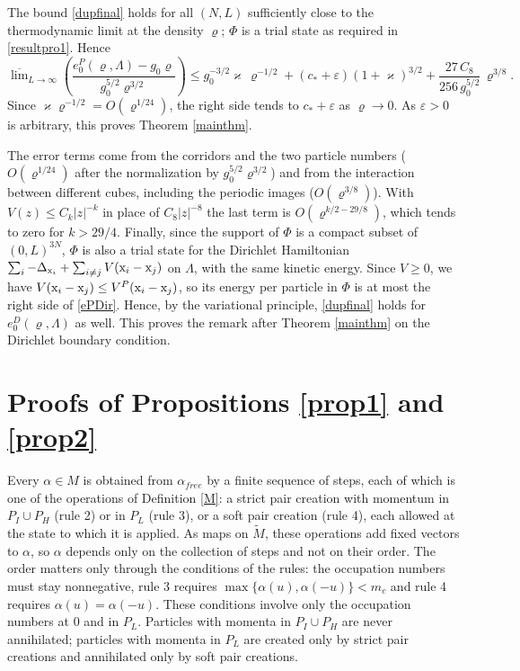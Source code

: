 \documentclass[11pt]{article}
\numberwithin{equation}{section}
\newcommand{\e}{\varepsilon}
\newcommand{\x}{{\rm x}}
\newcommand\al{{\alpha}}
\renewcommand\kappa\varkappa
\renewcommand\rho\varrho
\theoremstyle{definition}
\begin{document}
\smallskip{}
The bound \eqref{dupfinal} holds for all $(N,L)$ sufficiently close to the thermodynamic limit at the density $\rho$; $\Phi$ is a trial state as required in \eqref{resultpro1}. Hence
\[
\overline\lim_{L\to\infty}\left(\frac{e_0^P(\rho,\Lambda)-g_0\rho}{g_0^{5/2}\rho^{3/2}}\right)\leq g_0^{-3/2}\kappa\,\rho^{-1/2}+(c_*+\e)(1+\kappa)^{3/2}+\frac{27\,C_8}{256\,g_0^{5/2}}\,\rho^{3/8} .
\]
Since $\kappa\rho^{-1/2}=O(\rho^{1/24})$, the right side tends to $c_*+\e$ as $\rho\to0$. As $\e>0$ is arbitrary, this proves Theorem \ref{mainthm}.

The error terms come from the corridors and the two particle numbers ($O(\rho^{1/24})$ after the normalization by $g_0^{5/2}\rho^{3/2}$) and from the interaction between different cubes, including the periodic images ($O(\rho^{3/8})$).
With $V(z)\leq C_k|z|^{-k}$ in place of $C_8|z|^{-8}$ the last term is $O(\rho^{k/2-29/8})$, which tends to zero for $k>29/4$.
Finally, since the support of $\Phi$ is a compact subset of $(0,L)^{3N}$, $\Phi$ is also a trial state for the Dirichlet Hamiltonian $\sum_i-\Delta_{\x_i}+\sum_{i\neq j}V(\x_i-\x_j)$ on $\Lambda$, with the same kinetic energy. Since $V\geq0$, we have $V(\x_i-\x_j)\leq V^P(\x_i-\x_j)$, so its energy per particle in $\Phi$ is at most the right side of \eqref{ePDir}.
Hence, by the variational principle, \eqref{dupfinal} holds for $e_0^D(\rho,\Lambda)$ as well. This proves the remark after Theorem \ref{mainthm} on the Dirichlet boundary condition.




\appendix

\section{Proofs of Propositions \ref{prop1} and \ref{prop2}}\label{app:props}

Every $\al\in M$ is obtained from $\al_{free}$ by a finite sequence of steps, each of which is one of the operations of Definition \ref{M}:
a strict pair creation with momentum in $P_I\cup P_H$ (rule 2) or in $P_L$ (rule 3), or a soft pair creation (rule 4), each allowed at the state to which it is applied.
As maps on $\widetilde M$, these operations add fixed vectors to $\al$, so $\al$ depends only on the collection of steps and not on their order.
The order matters only through the conditions of the rules: the occupation numbers must stay nonnegative, rule 3 requires $\max\{\al(u),\al(-u)\}<m_c$ and rule 4 requires $\al(u)=\al(-u)$.
These conditions involve only the occupation numbers at $0$ and in $P_L$.
Particles with momenta in $P_I\cup P_H$ are never annihilated; particles with momenta in $P_L$ are created only by strict pair creations and annihilated only by soft pair creations.
\end{document}
